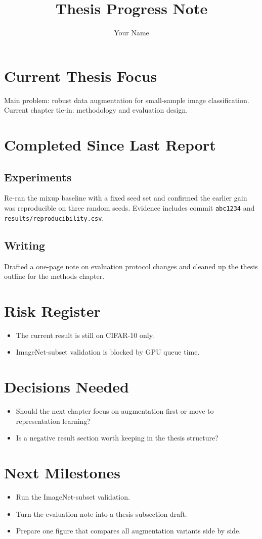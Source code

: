 \documentclass[11pt,a4paper]{report}
\title{Thesis Progress Note}
\author{Your Name}
\date{}
\begin{document}
\maketitle

\chapter*{Current Thesis Focus}
Main problem: robust data augmentation for small-sample image classification. Current chapter tie-in: methodology and evaluation design.

\chapter*{Completed Since Last Report}

\section*{Experiments}
Re-ran the mixup baseline with a fixed seed set and confirmed the earlier gain was reproducible on three random seeds. Evidence includes commit \texttt{abc1234} and \texttt{results/reproducibility.csv}.

\section*{Writing}
Drafted a one-page note on evaluation protocol changes and cleaned up the thesis outline for the methods chapter.

\chapter*{Risk Register}
\begin{itemize}[leftmargin=2em]
  \item The current result is still on CIFAR-10 only.
  \item ImageNet-subset validation is blocked by GPU queue time.
\end{itemize}

\chapter*{Decisions Needed}
\begin{itemize}[leftmargin=2em]
  \item Should the next chapter focus on augmentation first or move to representation learning?
  \item Is a negative result section worth keeping in the thesis structure?
\end{itemize}

\chapter*{Next Milestones}
\begin{itemize}[leftmargin=2em]
  \item Run the ImageNet-subset validation.
  \item Turn the evaluation note into a thesis subsection draft.
  \item Prepare one figure that compares all augmentation variants side by side.
\end{itemize}
\end{document}
